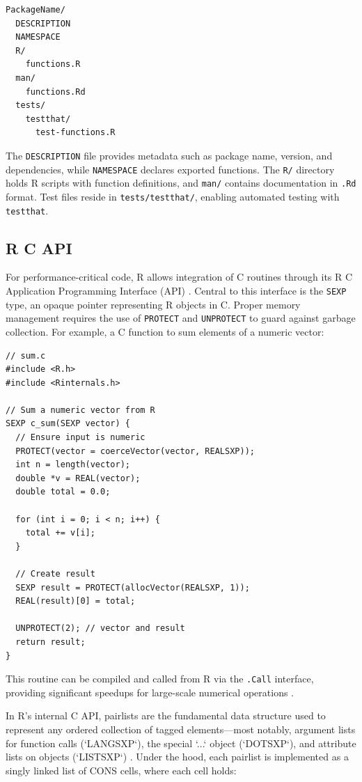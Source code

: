 \begin{verbatim}
PackageName/
  DESCRIPTION
  NAMESPACE
  R/
    functions.R
  man/
    functions.Rd
  tests/
    testthat/
      test-functions.R
\end{verbatim}

The \texttt{DESCRIPTION} file provides metadata such as package name, version, and dependencies, while \texttt{NAMESPACE} declares exported functions. The \texttt{R/} directory holds R scripts with function definitions, and \texttt{man/} contains documentation in \texttt{.Rd} format. Test files reside in \texttt{tests/testthat/}, enabling automated testing with \texttt{testthat}.

\subsection{R C API}

For performance-critical code, R allows integration of C routines through its R C Application Programming Interface (API) \cite{rcore2024}. Central to this interface is the \texttt{SEXP} type, an opaque pointer representing R objects in C. Proper memory management requires the use of \texttt{PROTECT} and \texttt{UNPROTECT} to guard against garbage collection. For example, a C function to sum elements of a numeric vector:

\begin{verbatim}
// sum.c
#include <R.h>
#include <Rinternals.h>

// Sum a numeric vector from R
SEXP c_sum(SEXP vector) {
  // Ensure input is numeric
  PROTECT(vector = coerceVector(vector, REALSXP));
  int n = length(vector);
  double *v = REAL(vector);
  double total = 0.0;

  for (int i = 0; i < n; i++) {
    total += v[i];
  }

  // Create result
  SEXP result = PROTECT(allocVector(REALSXP, 1));
  REAL(result)[0] = total;

  UNPROTECT(2); // vector and result
  return result;
}
\end{verbatim}

This routine can be compiled and called from R via the \texttt{.Call} interface, providing significant speedups for large-scale numerical operations \cite{rcore2024}.

In R’s internal C API, pairlists are the fundamental data structure used to represent any ordered collection of tagged elements—most notably, argument lists for function calls (`LANGSXP`), the special `...` object (`DOTSXP`), and attribute lists on objects (`LISTSXP`) \cite{hadley-r-internals-pairlists}.  Under the hood, each pairlist is implemented as a singly linked list of CONS cells, where each cell holds:

